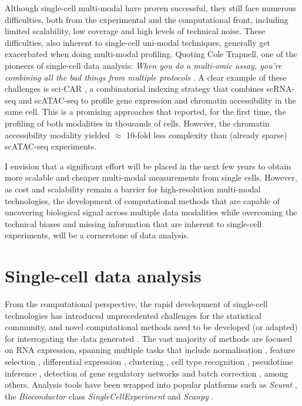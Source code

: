 Although single-cell multi-modal have proven successful, they still face numerous difficulties, both from the experimental and the computational front, including limited scalability, low coverage and high levels of technical noise. These difficulties, also inherent to single-cell uni-modal techniques, generally get exacerbated when doing multi-modal profiling. Quoting Cole Trapnell, one of the pioneers of single-cell data analysis: \textit{When you do a multi-omic assay, you're combining all the bad things from multiple protocols} \cite{Eisenstein2020}. A clear example of these challenges is sci-CAR \cite{Cao2018a}, a combinatorial indexing strategy that combines scRNA-seq and scATAC-seq to profile gene expression and chromatin accessibility in the same cell. This is a promising approaches that reported, for the first time, the profiling of both modalities in thousands of cells. However, the  chromatin accessibility modality yielded $\approx$ 10-fold less complexity than (already sparse) scATAC-seq experiments.

I envision that a significant effort will be placed in the next few years to obtain more scalable and cheaper multi-modal measurements from single cells. However, as cost and scalability remain a barrier for high-resolution multi-modal technologies, the development of computational methods that are capable of uncovering biological signal across multiple data modalities while overcoming the technical biases and missing information that are inherent to single-cell experiments, will be a cornerstone of data analysis.


\section{Single-cell data analysis}

From the computational perspective, the rapid development of single-cell technologies has introduced unprecedented challenges for the statistical community, and novel computational methods need to be developed (or adapted) for interrogating the data generated \cite{Stegle2015}. The vast majority of methods are focused on RNA expression, spanning multiple tasks that include normalisation \cite{Lun2016a}, feature selection \cite{Townes2019}, differential expression \cite{Kharchenko2014}, clustering \cite{Kiselev2017}, cell type recognition \cite{Abdelaal2019}, pseudotime inference \cite{Haghverdi2016}, detection of gene regulatory networks \cite{Aibar2017} and batch correction \cite{Haghverdi2018}, among others. Analysis tools have been wrapped into popular platforms such as \textit{Seurat} \cite{Butler2018}, the \textit{Bioconductor} class \textit{SingleCellExperiment} \cite{Amezquita2020} and \textit{Scanpy} \cite{Wolf2018}.

